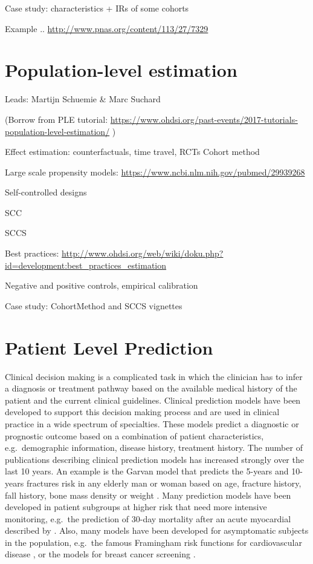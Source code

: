 \documentclass[]{book}
\begin{document}
Case study: characteristics + IRs of some cohorts

Example .. \url{http://www.pnas.org/content/113/27/7329}

\chapter{Population-level estimation}\label{PopulationLevelEstimation}

Leads: Martijn Schuemie \& Marc Suchard

(Borrow from PLE tutorial:
\url{https://www.ohdsi.org/past-events/2017-tutorials-population-level-estimation/}
)

Effect estimation: counterfactuals, time travel, RCTs Cohort method

Large scale propensity models:
\url{https://www.ncbi.nlm.nih.gov/pubmed/29939268}

Self-controlled designs

SCC

SCCS

Best practices:
\url{http://www.ohdsi.org/web/wiki/doku.php?id=development:best_practices_estimation}

Negative and positive controls, empirical calibration

Case study: CohortMethod and SCCS vignettes

\chapter{Patient Level Prediction}\label{PatientLevelPrediction}

Clinical decision making is a complicated task in which the clinician
has to infer a diagnosis or treatment pathway based on the available
medical history of the patient and the current clinical guidelines.
Clinical prediction models have been developed to support this decision
making process and are used in clinical practice in a wide spectrum of
specialties. These models predict a diagnostic or prognostic outcome
based on a combination of patient characteristics, e.g.~demographic
information, disease history, treatment history. The number of
publications describing clinical prediction models has increased
strongly over the last 10 years. An example is the Garvan model that
predicts the 5-years and 10-years fractures risk in any elderly man or
woman based on age, fracture history, fall history, bone mass density or
weight \citep{nguyen2008}. Many prediction models have been developed in
patient subgroups at higher risk that need more intensive monitoring,
e.g.~the prediction of 30-day mortality after an acute myocardial
described by \citet{lee1995}. Also, many models have been developed for
asymptomatic subjects in the population, e.g.~the famous Framingham risk
functions for cardiovascular disease \citep{wilson1998}, or the models
for breast cancer screening \citep{engel2015}.
\end{document}
